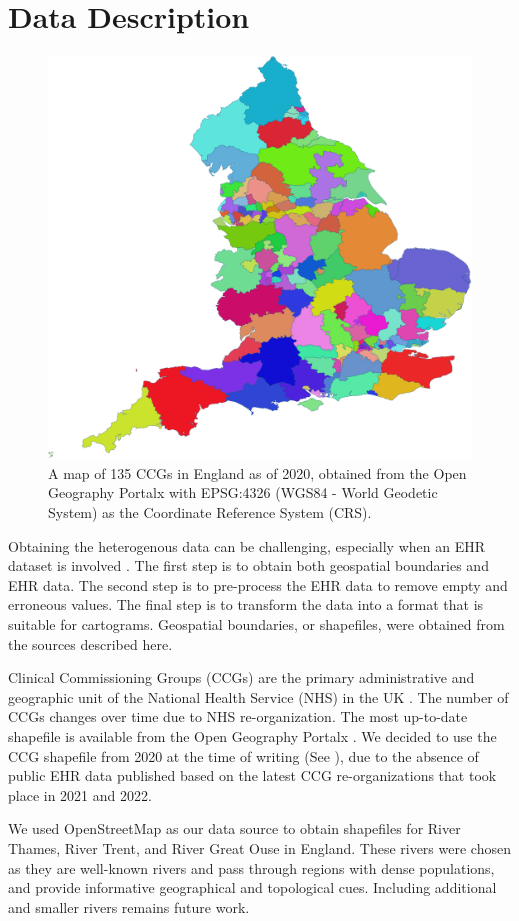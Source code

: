 \section{Data Description}

 {
  \begin{figure}[b!]
      \centering
      \includegraphics[width=0.6\columnwidth]{figure/ccg.png}
      \caption{A map of 135 CCGs in England as of 2020, obtained from the Open Geography Portalx \cite{opengeographyportalxOpen} with EPSG:4326 (WGS84 - World Geodetic System) as the Coordinate Reference System (CRS).}
      \label{fig:ccg}
  \end{figure}
 }

Obtaining the heterogenous data can be challenging, especially when an EHR dataset is involved \cite{wang2021EHRa}. The first step is to obtain both geospatial boundaries and EHR data. The second step is to pre-process the EHR data to remove empty and erroneous values. The final step is to transform the data into a format that is suitable for cartograms. Geospatial boundaries, or shapefiles, were obtained from the sources described here.

 Clinical Commissioning Groups (CCGs) are the primary administrative and geographic unit of the National Health Service (NHS) in the UK \cite{nhsNHS}. The number of CCGs changes over time due to NHS re-organization. The most up-to-date shapefile is available from the Open Geography Portalx \cite{opengeographyportalxOpen}. We decided to use the CCG shapefile from 2020 at the time of writing (See ), due to the absence of public EHR data published based on the latest CCG re-organizations that took place in 2021 and 2022.

 We used OpenStreetMap \cite{openstreetmapRelation} as our data source to obtain shapefiles for River Thames, River Trent, and River Great Ouse in England. These rivers were chosen as they are well-known rivers and pass through regions with dense populations, and provide informative geographical and topological cues. Including additional and smaller rivers remains future work.

